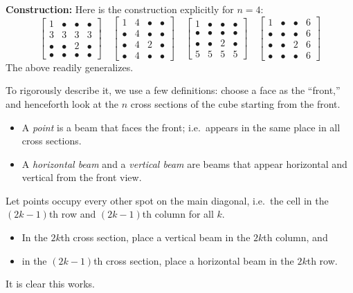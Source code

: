 \textbf{Construction:} Here is the construction explicitly for $n=4$:
\[
    \begin{bmatrix}
        1&\bullet&\bullet&\bullet\\
        3&3&3&3\\
        \bullet&\bullet&2&\bullet\\
        \bullet&\bullet&\bullet&\bullet
    \end{bmatrix}
    \quad
    \begin{bmatrix}
        1&4&\bullet&\bullet\\
        \bullet&4&\bullet&\bullet\\
        \bullet&4&2&\bullet\\
        \bullet&4&\bullet&\bullet
    \end{bmatrix}
    \quad
    \begin{bmatrix}
        1&\bullet&\bullet&\bullet\\
        \bullet&\bullet&\bullet&\bullet\\
        \bullet&\bullet&2&\bullet\\
        5&5&5&5
    \end{bmatrix}
    \quad
    \begin{bmatrix}
        1&\bullet&\bullet&6\\
        \bullet&\bullet&\bullet&6\\
        \bullet&\bullet&2&6\\
        \bullet&\bullet&\bullet&6
    \end{bmatrix}
\]
The above readily generalizes.

To rigorously describe it, we use a few definitions: choose a face as the ``front,'' and henceforth look at the $n$ cross sections of the cube starting from the front.
\begin{itemize}[itemsep=0em]
    \item A \emph{point} is a beam that faces the front; i.e.\ appears in the same place in all cross sections.
    \item A \emph{horizontal beam} and a \emph{vertical beam} are beams that appear horizontal and vertical from the front view.
\end{itemize}
Let points occupy every other spot on the main diagonal, i.e.\ the cell in the $(2k-1)$th row and $(2k-1)$th column for all $k$.
\begin{itemize}[itemsep=0em]
    \item In the $2k$th cross section, place a vertical beam in the $2k$th column, and
    \item in the $(2k-1)$th cross section, place a horizontal beam in the $2k$th row.
\end{itemize}
It is clear this works.

